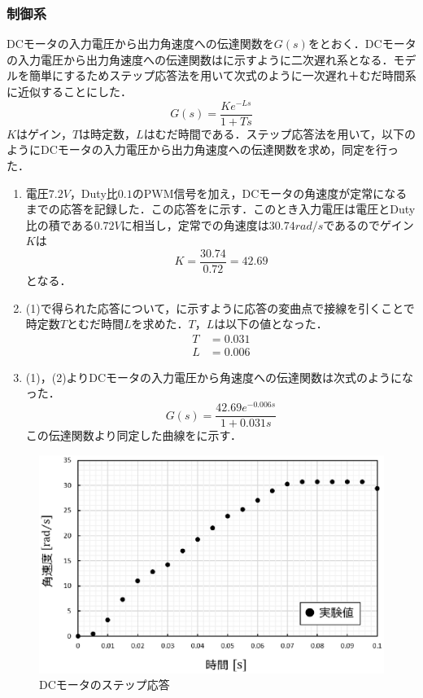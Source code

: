 \subsubsection{制御系}
  DCモータの入力電圧から出力角速度への伝達関数を$G(s)$をとおく．DCモータの入力電圧から出力角速度への伝達関数はに示すように二次遅れ系となる．モデルを簡単にするためステップ応答法を用いて次式のように一次遅れ＋むだ時間系に近似することにした．  
\begin{equation}
 G(s)=\frac{Ke^{-Ls}}{1+Ts}
\end{equation} 
$K$はゲイン，$T$は時定数，$L$はむだ時間である．ステップ応答法を用いて，以下のようにDCモータの入力電圧から出力角速度への伝達関数を求め，同定を行った．

\begin{enumerate}
\item 電圧$7.2\unit{V}$，Duty比$0.1$のPWM信号を加え，DCモータの角速度が定常になるまでの応答を記録した．この応答をに示す．このとき入力電圧は電圧とDuty比の積である$0.72\unit{V}$に相当し，定常での角速度は$30.74\unit{rad/s}$であるのでゲイン$K$は
\begin{equation}
 K=\frac{30.74}{0.72}=42.69
\end{equation}
となる．
\item (1)で得られた応答について，に示すように応答の変曲点で接線を引くことで時定数$T$とむだ時間$L$を求めた．$T$，$L$は以下の値となった．
\begin{align}
 T&=0.031 \\
 L&=0.006
\end{align}
\item(1)，(2)よりDCモータの入力電圧から角速度への伝達関数は次式のようになった．
\begin{equation}
 G(s)=\frac{42.69e^{-0.006s}}{1+0.031s}
\end{equation} 
この伝達関数より同定した曲線をに示す．
\end{enumerate}

\begin{figure}[htb]
  \centering
    \includegraphics[width=0.7\hsize]{picture/eps/dcmotor_response.eps}
  \caption{DCモータのステップ応答}
  \label{fig::dcmotor_response}
  
\end{figure}

